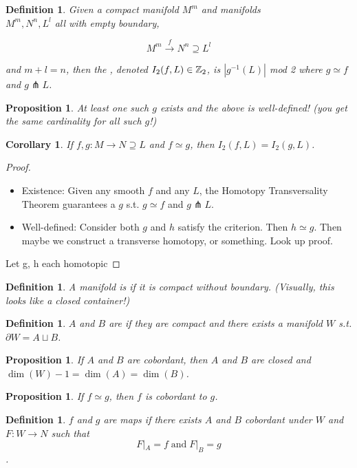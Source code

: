 \documentclass[11pt]{amsbook}
\theoremstyle{mystyle} \newtheorem{thrm}[thm]{Theorem}
\theoremstyle{mystyle} \newtheorem{defi}[thm]{Definition}
\theoremstyle{mystyle} \newtheorem{coro}[thm]{Corollary}
\theoremstyle{mystyle} \newtheorem{propo}[thm]{Proposition}
\theoremstyle{mystyle} \newtheorem{lemm}[thm]{Lemma}
\numberwithin{thm}{section}
\newcommand{\homotopic}{\simeq}
\renewcommand{\d}{\partial}
\newcommand{\transverse}{\pitchfork}
\begin{document}
\begin{defi}
	Given a compact manifold $M^m$ and manifolds \\$M^m, N^n, L^l$ all with empty boundary,

	$$M^m \overset{f}{\to} N^n \supseteq L^l$$

	and $m + l = n$, then the , denoted $I_2(f, L) \in {\mathbb Z}_2$, is $|g^{-1}(L)|$ mod 2 where $g \homotopic f$ and $g \transverse L$.
\end{defi}
\begin{propo}
	At least one such $g$ exists and the above is well-defined!  (you get the same cardinality for all such $g$!)
\end{propo}
\begin{coro}
	If $f,g: M \to N \supseteq L$ and $f \homotopic g$, then $I_2(f, L) = I_2(g, L)$.
\end{coro}
\begin{proof}
	\begin{itemize}
		\item Existence: Given any smooth $f$ and any $L$, the Homotopy Transversality Theorem guarantees a $g$ s.t. $g \homotopic f$ and $g \transverse L$.
		\item Well-defined: Consider both $g$ and $h$ satisfy the criterion.  Then $h \homotopic g$.  Then maybe we construct a transverse homotopy, or something.  Look up proof.
	\end{itemize}
		Let g, h each homotopic
\end{proof}
\begin{defi}
	A manifold is  if it is compact without boundary.  (Visually, this looks like a closed container!)
\end{defi}
\begin{defi}
	$A$ and $B$ are  if they are compact and there exists a manifold $W$ s.t. $\d W = A \sqcup B$.
\end{defi}
\begin{propo}
	If $A$ and $B$ are cobordant, then $A$ and $B$ are closed and $\dim(W)-1 = \dim(A) = \dim(B)$.
\end{propo}
\begin{propo}
	If $f \homotopic g$, then $f$ is cobordant to $g$.
\end{propo}
\begin{defi}
	$f$ and $g$ are  maps if there exists $A$ and $B$ cobordant under $W$ and $F: W \to N$ such that
	$$F|_A = f \;\text{and}\; F|_B = g$$.
\end{defi}
\end{document}
